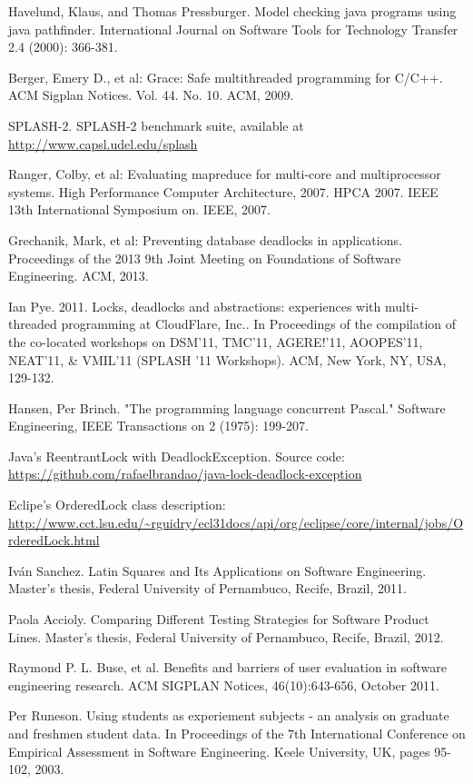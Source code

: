 \begin{thebibliography}{4}
 Havelund, Klaus, and Thomas Pressburger. Model checking java programs using java pathfinder. International Journal on Software Tools for Technology Transfer 2.4 (2000): 366-381.

 Berger, Emery D., et al: Grace: Safe multithreaded programming for C/C++.
ACM Sigplan Notices. Vol. 44. No. 10. ACM, 2009.

 SPLASH-2. SPLASH-2 benchmark suite, available at \url{http://www.capsl.udel.edu/splash}

 Ranger, Colby, et al: Evaluating mapreduce for multi-core and multiprocessor systems.
High Performance Computer Architecture, 2007. HPCA 2007. IEEE 13th International Symposium on. IEEE, 2007.

 Grechanik, Mark, et al: Preventing database deadlocks in applications.
Proceedings of the 2013 9th Joint Meeting on Foundations of Software Engineering. ACM, 2013.

 Ian Pye. 2011. Locks, deadlocks and abstractions: experiences with multi-threaded programming at CloudFlare, Inc.. In Proceedings of the compilation of the co-located workshops on DSM'11, TMC'11, AGERE!'11, AOOPES'11, NEAT'11, \& VMIL'11 (SPLASH '11 Workshops). ACM, New York, NY, USA, 129-132.

 Hansen, Per Brinch. "The programming language concurrent Pascal." Software Engineering, IEEE Transactions on 2 (1975): 199-207.

 Java's ReentrantLock with DeadlockException. Source code: \url{https://github.com/rafaelbrandao/java-lock-deadlock-exception}

 Eclipe's OrderedLock class description: \url{http://www.cct.lsu.edu/~rguidry/ecl31docs/api/org/eclipse/core/internal/jobs/OrderedLock.html}

 Iván Sanchez. Latin Squares and Its Applications on Software Engineering. Master's thesis, Federal University of Pernambuco, Recife, Brazil, 2011.

 Paola Accioly. Comparing Different Testing Strategies for Software Product Lines. Master's thesis, Federal University of Pernambuco, Recife, Brazil, 2012.

 Raymond P. L. Buse, et al. Benefits and barriers of user evaluation in software engineering research. ACM SIGPLAN Notices, 46(10):643-656, October 2011.

 Per Runeson. Using students as experiement subjects - an analysis on graduate and freshmen student data. In Proceedings of the 7th International Conference on Empirical Assessment in Software Engineering. Keele University, UK, pages 95-102, 2003.


\end{thebibliography}
